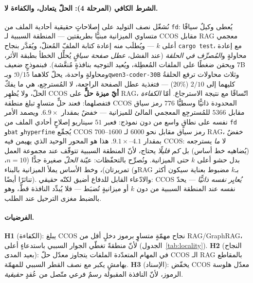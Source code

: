 \documentclass[11pt]{article}
\newcommand{\code}[1]{\textenglish{\texttt{#1}}}
\begin{document}
\paragraph{الشرط الكافي (المرحلة 4): الحلّ يتعادل، والكفاءة لا.} نُشغّل نصف التوليد على
إصلاحاتٍ حقيقية أحادية الملف من \code{fd}: يُعطى وكيلٌ سياقًا متساوي الميزانية مبنيًّا
بطريقتين --- المنطقة السببية لـ CCOS مقابل RAG معجمي أعلى $k$ --- ويُطلَب منه إعادة كتابة
الملفّ المُعتلّ، ويُقدَّر بنجاح \code{cargo test}، مع إعادة محاولةٍ و\emph{المُصرِّف في
الحلقة} (عند الفشل، \emph{عطل صفحة سياقٍ} يُحلِّل الخطأ بطبقة الأثر، ويحقن ضغطًا على الملفات
المُعطِلة، ويُعيد التوجيه بنافذةٍ مُنعَّشة). فبنموذجٍ ضعيف $7$B ومحاولةٍ واحدة، يحلّ كلاهما
$0/15$؛ وبـ\code{qwen3-coder-30B} وثلاث محاولات ترفع الحلقةُ كليهما إلى $2/10$ ($20\%$) ---
فتغذية عطل الصفحة الراجعة، لا المُسترجِع، هي ما يفكّ الحلّ، ولا يُظهِر CCOS \textbf{أيّ ميزة
حلٍّ} على RAG، اتّساقًا مع نتيجة الاسترجاع. أمّا \emph{الكفاءة} فتفصلهما: فعند حلٍّ متساوٍ
تبلغ منطقة CCOS المحدودة ذاتيًّا وسطيًّا $776$ رمز سياق مقابل $5366$ للمُسترجِع المعجمي
المالئ للميزانية --- خفضٌ بمقدار $\mathbf{6.9\times}$. ويصمد الأمر نفسه على نطاقٍ واسع من دون
نموذج: فعبر $51$ سيناريو إصلاحٍ أحادي الملف من \code{fd} و\code{bat} و\code{hyperfine} يُجمِّع
CCOS $700$--$1600$ رمز سياق مقابل نحو $6000$ لـ RAG، خفضٌ بمقدار $\mathbf{4.1}$--$\mathbf{9.1\times}$.
هذا هو المحور الوحيد الذي يهيمن فيه CCOS: لا \emph{ما} يسترجعه (يُضاهيه خط أساس) بل \emph{كم
قليلًا} يحتاج، لأنّ المنطقة السببية تتوقّف عند مجموعة العمل بدل حشو أعلى $k$ حتى الميزانية.
ونُصرِّح بالتحفّظات: عيّنة \emph{الحلّ} صغيرة جدًّا ($n{=}10$، تمريرتان)، وخط الأساس يملأ
الميزانية بالبناء (وRAG بـ$k$ مضبوط بعناية سيكون أكثر تناثرًا أيضًا). والادّعاء القابل للدفاع
أضيق لكنّه حقيقي: CCOS \emph{يُعايِر نفسه ذاتيًّا} --- يحدّ نفسه عند المنطقة السببية من دون
$k$ أو ميزانيةٍ تُضبَط --- فلا يُبدِّد النافذة قطّ، وهو بالضبط مغزى الترحيل عند الطلب.

\paragraph{الفرضيات.}
\textbf{H1} (الكفاءة): يبلغ CCOS نجاح مهمّةٍ متساوٍ برموز دخلٍ أقل من RAG/GraphRAG، لأنّ منطقةً
تغطّي الجوار السببي باستدعاءٍ أعلى (الجدول~\ref{tab:locality}).
\textbf{H2} (النجاح بعيد المدى): في المهام المتعدّدة الملفات يتجاوز معدّل حلّ CCOS الـ RAG
بالمقاطع بهامشٍ يكبر مع نصف القطر السببي للمهمّة.
\textbf{H3} (الإسناد): يخفّض CCOS معدّل هلوسة الرموز، لأنّ النافذة المقبولة رسمٌ فرعي متّصل من
عُقدٍ \emph{حقيقية}.
\end{document}
